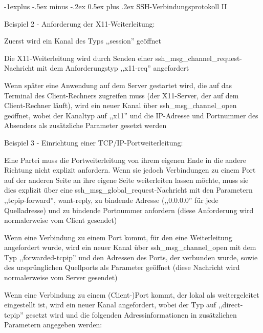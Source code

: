 \documentclass[a4paper]{article}
\makeatletter
\renewcommand{\subsection}{\@startsection{subsection}{2}{0mm}%
 {-1explus -.5ex minus -.2ex}%
 {0.5ex plus .2ex}%
 {\normalfont\normalsize\bfseries}}
\makeatother
\begin{document}
\begin{multicols}{3}
\begin{itemize*}
            \subsection{SSH-Verbindungsprotokoll
                  II}
            \begin{itemize*}
                  \item       Beispiel 2 - Anforderung der X11-Weiterleitung:
                  \begin{itemize*}
                        \item Zuerst wird ein Kanal des Typs ,,session'' geöffnet
                        \item Die X11-Weiterleitung wird durch Senden einer ssh\_msg\_channel\_request-Nachricht mit dem Anforderungstyp ,,x11-req'' angefordert
                        \item Wenn später eine Anwendung auf dem Server gestartet wird, die auf das Terminal des Client-Rechners zugreifen muss (der X11-Server, der auf dem Client-Rechner läuft), wird ein neuer Kanal über ssh\_msg\_channel\_open geöffnet, wobei der Kanaltyp auf ,,x11'' und die IP-Adresse und Portnummer des Absenders als zusätzliche Parameter gesetzt werden
                  \end{itemize*}
                  \item       Beispiel 3 - Einrichtung einer TCP/IP-Portweiterleitung:
                  \begin{itemize*}
                        \item Eine Partei muss die Portweiterleitung von ihrem eigenen Ende in die andere Richtung nicht explizit anfordern. Wenn sie jedoch Verbindungen zu einem Port auf der anderen Seite an ihre eigene Seite weiterleiten lassen möchte, muss sie dies explizit über eine ssh\_msg\_global\_request-Nachricht mit den Parametern ,,tcpip-forward'', want-reply, zu bindende Adresse (,,0.0.0.0'' für jede Quelladresse) und zu bindende Portnummer anfordern (diese Anforderung wird normalerweise vom Client gesendet)
                        \item Wenn eine Verbindung zu einem Port kommt, für den eine Weiterleitung angefordert wurde, wird ein neuer Kanal über ssh\_msg\_channel\_open mit dem Typ ,,forwarded-tcpip'' und den Adressen des Ports, der verbunden wurde, sowie des ursprünglichen Quellports als Parameter geöffnet (diese Nachricht wird normalerweise vom Server gesendet)
                        \item Wenn eine Verbindung zu einem (Client-)Port kommt, der lokal als weitergeleitet eingestellt ist, wird ein neuer Kanal angefordert, wobei der Typ auf ,,direct-tcpip'' gesetzt wird und die folgenden Adressinformationen in zusätzlichen Parametern angegeben werden:

\end{itemize*}
\end{itemize*}
\end{itemize*}
\end{multicols}
\end{document}
